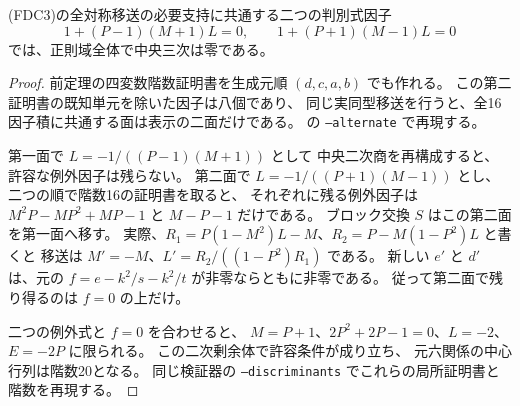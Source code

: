 \begin{proposition}\label{prop:cubic-CY-one-segre-double-split-FDC-two-discriminants}
(FDC3)の全対称移送の必要支持に共通する二つの判別式因子
\[
 1+(P-1)(M+1)L=0,\qquad 1+(P+1)(M-1)L=0
\]
では、正則域全体で中央三次は零である。
\end{proposition}
\begin{proof}
前定理の四変数階数証明書を生成元順 $(d,c,a,b)$ でも作れる。
この第二証明書の既知単元を除いた因子は八個であり、
同じ実同型移送を行うと、全16因子積に共通する面は表示の二面だけである。
の \texttt{--alternate} で再現する。

第一面で $L=-1/((P-1)(M+1))$ として
中央二次商を再構成すると、許容な例外因子は残らない。
第二面で $L=-1/((P+1)(M-1))$ とし、
二つの順で階数16の証明書を取ると、
それぞれに残る例外因子は
$M^2P-MP^2+MP-1$ と $M-P-1$ だけである。
ブロック交換 $S$ はこの第二面を第一面へ移す。
実際、$R_1=P(1-M^2)L-M$、$R_2=P-M(1-P^2)L$ と書くと
移送は $M'=-M$、$L'=R_2/((1-P^2)R_1)$ である。
新しい $e'$ と $d'$ は、元の $f=e-k^2/s-k^2/t$ が非零ならともに非零である。
従って第二面で残り得るのは $f=0$ の上だけ。

二つの例外式と $f=0$ を合わせると、
$M=P+1$、$2P^2+2P-1=0$、$L=-2$、$E=-2P$ に限られる。
この二次剰余体で許容条件が成り立ち、
元六関係の中心行列は階数20となる。
同じ検証器の \texttt{--discriminants} でこれらの局所証明書と階数を再現する。
\end{proof}

